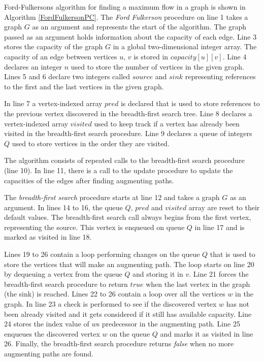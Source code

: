 \documentclass{l4proj}
\begin{document}
\noindent Ford-Fulkerson\textquotesingle s algorithm \cite{ford1956maximal} for finding a maximum flow in a graph is shown in Algorithm \ref{FordFulkersonPC}. The \textit{Ford Fulkerson} procedure on line 1 takes a graph $G$ as an argument and represents the start of the algorithm. The graph passed as an argument holds information about the capacity of each edge. Line 3 stores the capacity of the graph $G$ in a global two-dimensional integer array. The capacity of an edge between vertices $u$, $v$ is stored in $capacity[u][v]$. Line 4 declares an integer $n$ used to store the number of vertices in the given graph. Lines 5 and 6 declare two integers called $source$ and $sink$ representing references to the first and the last vertices in the given graph.

\noindent In line 7 a vertex-indexed array $pred$ is declared that is used to store references to the previous vertex discovered in the breadth-first search tree. Line 8 declares a vertex-indexed array $visited$ used to keep track if a vertex has already been visited in the breadth-first search procedure. Line 9 declares a queue of integers $Q$ used to store vertices in the order they are visited.

\noindent The algorithm consists of repeated calls to the breadth-first search procedure (line 10). In line 11, there is a call to the update procedure to update the capacities of the edges after finding augmenting paths.

\noindent The \textit{breadth-first search} procedure starts at line 12 and takes a graph $G$ as an argument. In lines 14 to 16, the queue $Q$, $pred$ and $visited$ array are reset to their default values. The breadth-first search call always begins from the first vertex, representing the source. This vertex is enqueued on queue $Q$ in line 17 and is marked as visited in line 18.

\noindent Lines 19 to 26 contain a loop performing changes on the queue $Q$ that is used to store the vertices that will make an augmenting path. The loop starts on line 20 by dequeuing a vertex from the queue $Q$ and storing it in $v$. Line 21 forces the breadth-first search procedure to return $true$ when the last vertex in the graph (the sink) is reached. Lines 22 to 26 contain a loop over all the vertices $w$ in the graph. In line 23 a check is performed to see if the discovered vertex $w$ has not been already visited and it gets considered if it still has available capacity. Line 24 stores the index value of $w$\textquotesingle s predecessor in the augmenting path. Line 25 enqueues the discovered vertex $w$ on the queue $Q$ and marks it as visited in line 26. Finally, the breadth-first search procedure returns \textit{false} when no more augmenting paths are found.
\end{document}
